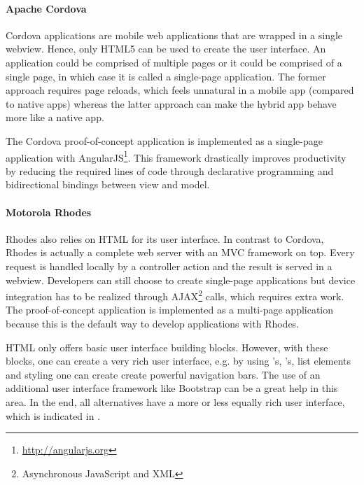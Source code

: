 \paragraph{Apache Cordova} Cordova applications are mobile web applications that are wrapped in a single webview. Hence, only HTML5 can be used to create the user interface. An application could be comprised of multiple pages or it could be comprised of a single page, in which case it is called  a single-page application. The former approach requires page reloads, which feels unnatural in a mobile app (compared to native apps) whereas the latter approach can make the hybrid app behave more like a native app. 

The Cordova proof-of-concept application is implemented as a single-page application with AngularJS\footnote{\url{http://angularjs.org}}. This framework drastically improves productivity by reducing the required lines of code through declarative programming and bidirectional bindings between view and model. 

\paragraph{Motorola Rhodes} Rhodes also relies on HTML for its user interface. In contrast to Cordova, Rhodes is actually a complete web server with an MVC framework on top. Every request is handled locally by a controller action and the result is served in a webview. Developers can still choose to create single-page applications but device integration has to be realized through AJAX\footnote{Asynchronous JavaScript and XML} calls, which requires extra work. The proof-of-concept application is implemented as a multi-page application because this is the default way to develop applications with Rhodes.

HTML only offers basic user interface building blocks. However, with these blocks, one can create a very rich user interface, e.g. by using 's, 's, list elements and styling one can create create powerful navigation bars. The use of an additional user interface framework like Bootstrap can be a great help in this area. In the end, all alternatives have a more or less equally rich user interface, which is indicated in .

